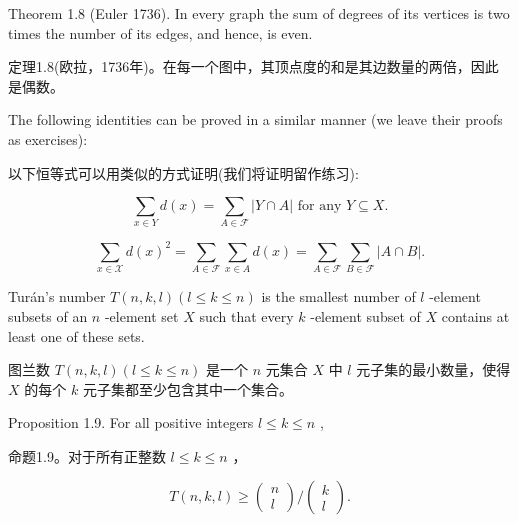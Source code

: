 \documentclass[10pt]{article}
\begin{document}
Theorem 1.8 (Euler 1736). In every graph the sum of degrees of its vertices is two times the number of its edges, and hence, is even.

\begin{tcolorbox}\relax
定理1.8(欧拉，1736年)。在每一个图中，其顶点度的和是其边数量的两倍，因此是偶数。
\end{tcolorbox}

The following identities can be proved in a similar manner (we leave their proofs as exercises):

\begin{tcolorbox}\relax
以下恒等式可以用类似的方式证明(我们将证明留作练习):
\end{tcolorbox}

\[
\mathop{\sum }\limits_{{x \in  Y}}d\left( x\right)  = \mathop{\sum }\limits_{{A \in  \mathcal{F}}}\left| {Y \cap  A}\right| \text{ for any }Y \subseteq  X. \tag{1.11}
\]

\[
\mathop{\sum }\limits_{{x \in  \mathcal{X}}}d{\left( x\right) }^{2} = \mathop{\sum }\limits_{{A \in  \mathcal{F}}}\mathop{\sum }\limits_{{x \in  A}}d\left( x\right)  = \mathop{\sum }\limits_{{A \in  \mathcal{F}}}\mathop{\sum }\limits_{{B \in  \mathcal{F}}}\left| {A \cap  B}\right| . \tag{1.12}
\]

Turán’s number \(T\left( {n,k,l}\right) \left( {l \leq  k \leq  n}\right)\) is the smallest number of \(l\) -element subsets of an \(n\) -element set \(X\) such that every \(k\) -element subset of \(X\) contains at least one of these sets.

\begin{tcolorbox}\relax
图兰数 \(T\left( {n,k,l}\right) \left( {l \leq  k \leq  n}\right)\) 是一个 \(n\) 元集合 \(X\) 中 \(l\) 元子集的最小数量，使得 \(X\) 的每个 \(k\) 元子集都至少包含其中一个集合。
\end{tcolorbox}

Proposition 1.9. For all positive integers \(l \leq  k \leq  n\) ,

\begin{tcolorbox}\relax
命题1.9。对于所有正整数 \(l \leq  k \leq  n\) ，
\end{tcolorbox}

\[
T\left( {n,k,l}\right)  \geq  \left( \begin{array}{l} n \\  l \end{array}\right) /\left( \begin{array}{l} k \\  l \end{array}\right) .
\]
\end{document}
